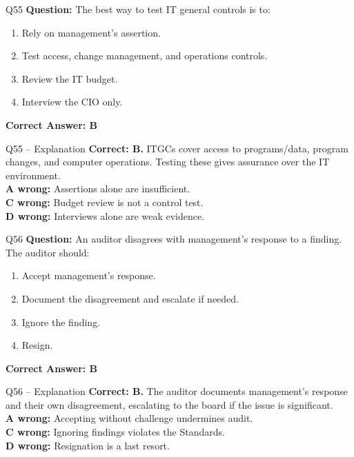 \documentclass[aspectratio=169,10pt]{beamer}
\begin{document}
	\begin{frame}[t]{Q55}
		\small
		\textbf{Question:} The best way to test IT general controls is to:
		\begin{enumerate}[label=\Alph*.,itemsep=1pt,topsep=2pt]
			\item Rely on management's assertion.
			\item Test access, change management, and operations controls.
			\item Review the IT budget.
			\item Interview the CIO only.
		\end{enumerate}
		\vspace{4pt}
		\textbf{Correct Answer: B}
	\end{frame}
	
	\begin{frame}[t]{Q55 -- Explanation}
		\small
		\textbf{Correct: B.} ITGCs cover access to programs/data, program changes, and computer operations. Testing these gives assurance over the IT environment. \\[4pt]
		\textbf{A wrong:} Assertions alone are insufficient. \\[2pt]
		\textbf{C wrong:} Budget review is not a control test. \\[2pt]
		\textbf{D wrong:} Interviews alone are weak evidence.
	\end{frame}
	
	\begin{frame}[t]{Q56}
		\small
		\textbf{Question:} An auditor disagrees with management's response to a finding. The auditor should:
		\begin{enumerate}[label=\Alph*.,itemsep=1pt,topsep=2pt]
			\item Accept management's response.
			\item Document the disagreement and escalate if needed.
			\item Ignore the finding.
			\item Resign.
		\end{enumerate}
		\vspace{4pt}
		\textbf{Correct Answer: B}
	\end{frame}
	
	\begin{frame}[t]{Q56 -- Explanation}
		\small
		\textbf{Correct: B.} The auditor documents management's response and their own disagreement, escalating to the board if the issue is significant. \\[4pt]
		\textbf{A wrong:} Accepting without challenge undermines audit. \\[2pt]
		\textbf{C wrong:} Ignoring findings violates the Standards. \\[2pt]
		\textbf{D wrong:} Resignation is a last resort.
	\end{frame}
	
\end{document}
